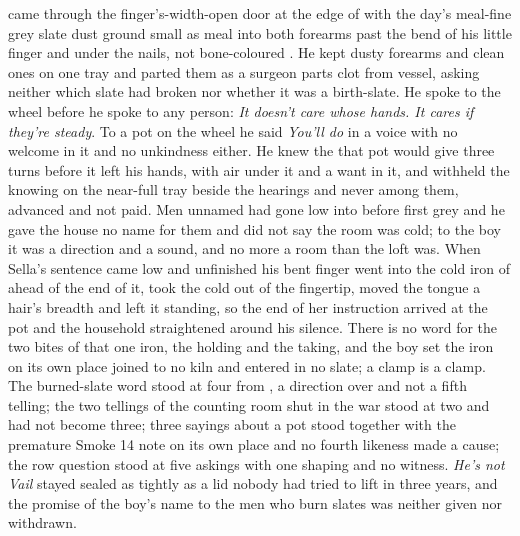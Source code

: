  came through the finger's-width-open door at the edge of  with the day's meal-fine grey slate dust ground small as meal into both forearms past the bend of his little finger and under the nails, not bone-coloured . He kept dusty forearms and clean ones on one tray and parted them as a surgeon parts clot from vessel, asking neither which slate had broken nor whether it was a birth-slate. He spoke to the wheel before he spoke to any person: \emph{It doesn't care whose hands. It cares if they're steady}. To a pot on the wheel he said \emph{You'll do} in a voice with no welcome in it and no unkindness either. He knew the  that pot would give three turns before it left his hands, with air under it and a want in it, and withheld the knowing on the near-full tray beside the hearings and never among them, advanced and not paid. Men unnamed had gone low into  before first grey and he gave the house no name for them and did not say the room was cold; to the boy it was a direction and a sound, and no more a room than the loft was. When Sella's sentence came low and unfinished his bent finger went into the cold iron of  ahead of the end of it, took the cold out of the fingertip, moved the tongue a hair's breadth and left it standing, so the end of her instruction arrived at the pot and the household straightened around his silence. There is no  word for the two bites of that one iron, the holding and the taking, and the boy set the iron on its own place joined to no kiln and entered in no slate; a clamp is a clamp. The burned-slate word stood at four from , a direction over  and not a fifth telling; the two tellings of the counting room shut in the war stood at two and had not become three; three sayings about a pot stood together with the premature Smoke 14 note on its own place and no fourth likeness made a cause; the row question stood at five askings with one shaping and no witness. \emph{He's not Vail} stayed sealed as tightly as a lid nobody had tried to lift in three years, and the promise of the boy's name to the men who burn slates was neither given nor withdrawn.

